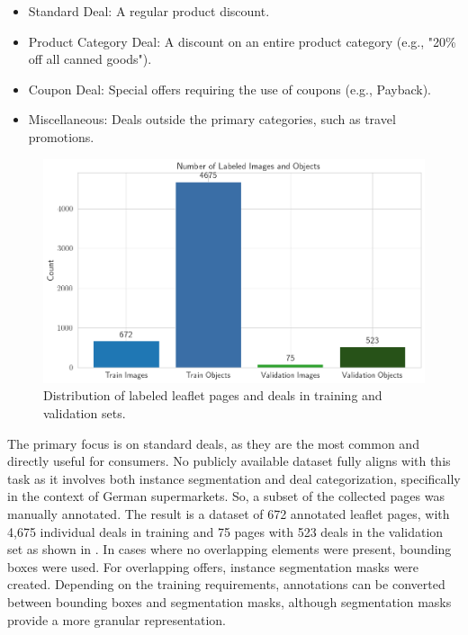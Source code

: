 \documentclass[11pt]{article}
\begin{document}
\begin{itemize}
    \item Standard Deal: A regular product discount.
    \item Product Category Deal: A discount on an entire product category (e.g., "20\% off all canned goods").
    \item Coupon Deal: Special offers requiring the use of coupons (e.g., Payback).
    \item Miscellaneous: Deals outside the primary categories, such as travel promotions.
\end{itemize}

\begin{figure}[h!]
    \centering
    \includegraphics[width=0.7\linewidth]{figures/deal_detection/dataset_count.png}
    \caption{Distribution of labeled leaflet pages and deals in training and validation sets.}
    \label{fig:ddetect_dataset_count}
\end{figure}

The primary focus is on standard deals, as they are the most common and directly useful for consumers. No publicly available dataset fully aligns with this task as it involves both instance segmentation and deal categorization, specifically in the context of German supermarkets. So, a subset of the collected pages was manually annotated. The result is a dataset of 672 annotated leaflet pages, with 4,675 individual deals in training and 75 pages with 523 deals in the validation set as shown in . In cases where no overlapping elements were present, bounding boxes were used. For overlapping offers, instance segmentation masks were created. Depending on the training requirements, annotations can be converted between bounding boxes and segmentation masks, although segmentation masks provide a more granular representation.

\end{document}
